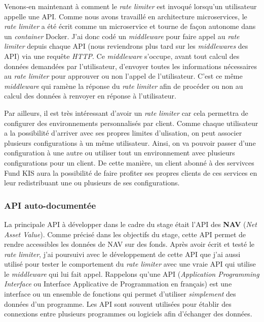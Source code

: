 \vspace{3mm}

Venons-en maintenant à comment le \textit{rate limiter} est invoqué lorsqu'un utilisateur appelle une API. Comme nous avons travaillé en architecture microservices, le \textit{rate limiter} a été écrit comme un microservice et tourne de façon autonome dans un \textit{container} Docker. J'ai donc codé un \textit{middleware} pour faire appel au \textit{rate limiter} depuis chaque API (nous reviendrons plus tard sur les \textit{middlewares} des API) via une requête \textit{HTTP}. Ce \textit{middleware} s'occupe, avant tout calcul des données demandées par l'utilisateur, d'envoyer toutes les informations nécessaires au \textit{rate limiter} pour approuver ou non l'appel de l'utilisateur. C'est ce même \textit{middleware} qui ramène la réponse du \textit{rate limiter} afin de procéder ou non au calcul des données à renvoyer en réponse à l'utilisateur.

\vspace{3mm}

Par ailleurs, il est très intéressant d'avoir un \textit{rate limiter} car cela permettra de configurer des environnements personnalisés par client. Comme chaque utilisateur a la possibilité d'arriver avec ses propres limites d'ulisation, on peut associer plusieurs configurations à un même utilisateur. Ainsi, on va pouvoir passer d'une configuration à une autre ou utiliser tout un environnement avec plusieurs configurations pour un client. De cette manière, un client abonné à des servivces Fund KIS aura la possibilité de faire profiter ses propres clients de ces services en leur redistribuant une ou plusieurs de ses configurations.



\subsubsection{API auto-documentée}
La principale API à développer dans le cadre du stage était l'API des \textbf{NAV} (\textit{Net Asset Value}). Comme précisé dans les objectifs du stage, cette API permet de rendre accessibles les données de NAV sur des fonds. Après avoir écrit et testé le \textit{rate limiter}, j'ai poursuivi avec le développement de cette API que j'ai aussi utilisé pour tester le comportement du \textit{rate limiter} avec une vraie API qui utilise le \textit{middleware} qui lui fait appel. Rappelons qu'une API (\textit{Application Programming Interface} ou Interface Applicative de Programmation en français) est une interface ou un ensemble de fonctions qui permet d'utiliser \emph{simplement} des données d'un programme. Les API sont souvent utilisées pour établir des connexions entre plusieurs programmes ou logiciels afin d'échanger des données.

